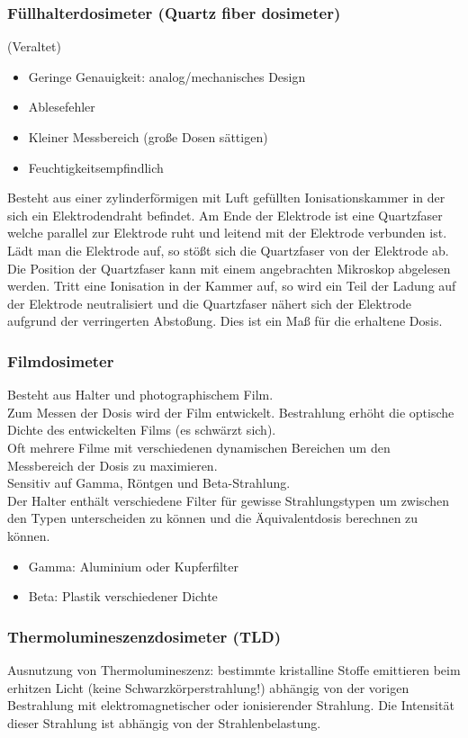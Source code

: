 \documentclass[11pt, a4paper]{article}
\numberwithin{equation}{section}
\begin{document}
\subsubsection{Füllhalterdosimeter (Quartz fiber dosimeter)}
(Veraltet)
\begin{itemize}
	\item Geringe Genauigkeit: analog/mechanisches Design
	\item Ablesefehler
	\item Kleiner Messbereich (große Dosen sättigen)
	\item Feuchtigkeitsempfindlich
\end{itemize}
Besteht aus einer zylinderförmigen mit Luft gefüllten Ionisationskammer in der sich ein Elektrodendraht befindet.
Am Ende der Elektrode ist eine Quartzfaser welche parallel zur Elektrode ruht und leitend mit der Elektrode verbunden ist.
Lädt man die Elektrode auf, so stößt sich die Quartzfaser von der Elektrode ab.
Die Position der Quartzfaser kann mit einem angebrachten Mikroskop abgelesen werden.
Tritt eine Ionisation in der Kammer auf, so wird ein Teil der Ladung auf der Elektrode neutralisiert und die Quartzfaser nähert sich der Elektrode aufgrund der verringerten Abstoßung.
Dies ist ein Maß für die erhaltene Dosis.

\subsubsection{Filmdosimeter}
Besteht aus Halter und photographischem Film.\\
Zum Messen der Dosis wird der Film entwickelt. Bestrahlung erhöht die optische Dichte des entwickelten Films (es schwärzt sich).\\
Oft mehrere Filme mit verschiedenen dynamischen Bereichen um den Messbereich der Dosis zu maximieren.\\
Sensitiv auf Gamma, Röntgen und Beta-Strahlung.\\
Der Halter enthält verschiedene Filter für gewisse Strahlungstypen um zwischen den Typen unterscheiden zu können und die Äquivalentdosis berechnen zu können.\\
\begin{itemize}
	\item Gamma: Aluminium oder Kupferfilter
	\item Beta: Plastik verschiedener Dichte
\end{itemize}

\subsubsection{Thermolumineszenzdosimeter (TLD)}
Ausnutzung von Thermolumineszenz: bestimmte kristalline Stoffe emittieren beim erhitzen Licht (keine Schwarzkörperstrahlung!) abhängig von der vorigen Bestrahlung mit elektromagnetischer oder ionisierender Strahlung.
Die Intensität dieser Strahlung ist abhängig von der Strahlenbelastung.
\end{document}
